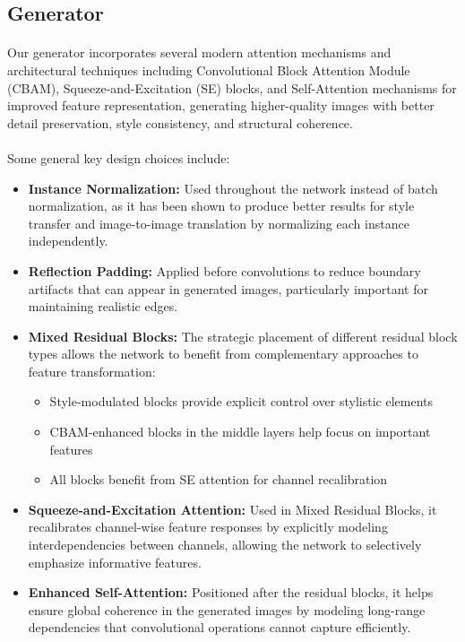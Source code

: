 \documentclass[twoside,english,notitlepage]{report}
\begin{document}
\subsection{Generator}
\paragraph{} Our generator incorporates several modern attention mechanisms and architectural techniques including Convolutional Block Attention Module (CBAM), Squeeze-and-Excitation (SE) blocks, and Self-Attention mechanisms for improved feature representation, generating higher-quality images with better detail preservation, style consistency, and structural coherence.

\paragraph{} Some general key design choices include:
\begin{itemize}
    \item \textbf{Instance Normalization:} Used throughout the network instead of batch normalization, as it has been shown to produce better results for style transfer and image-to-image translation by normalizing each instance independently.

    \item \textbf{Reflection Padding:} Applied before convolutions to reduce boundary artifacts that can appear in generated images, particularly important for maintaining realistic edges.

    \item \textbf{Mixed Residual Blocks:} The strategic placement of different residual block types allows the network to benefit from complementary approaches to feature transformation:
    \begin{itemize}
        \item Style-modulated blocks provide explicit control over stylistic elements
        \item CBAM-enhanced blocks in the middle layers help focus on important features
        \item All blocks benefit from SE attention for channel recalibration
    \end{itemize}
    
    \item \textbf{Squeeze-and-Excitation Attention:} Used in Mixed Residual Blocks, it recalibrates channel-wise feature responses by explicitly modeling interdependencies between channels, allowing the network to selectively emphasize informative features.

    \item \textbf{Enhanced Self-Attention:} Positioned after the residual blocks, it helps ensure global coherence in the generated images by modeling long-range dependencies that convolutional operations cannot capture efficiently.

\end{itemize}
\end{document}
